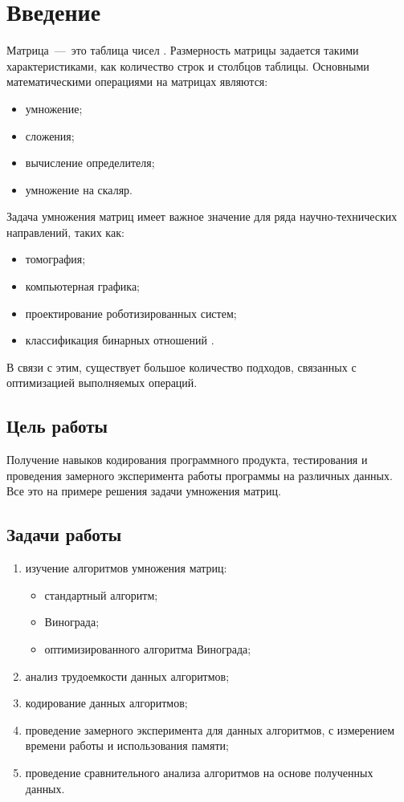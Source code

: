 \setcounter{page}{3}
\chapter*{Введение}

Матрица~---~это таблица чисел \cite{bib:1}. Размерность матрицы задается такими характеристиками, как количество строк и столбцов таблицы. Основными математическими операциями на матрицах являются:

\begin{itemize}
	\item умножение;
	\item сложения;
	\item вычисление определителя;
	\item умножение на скаляр.
\end{itemize}

Задача умножения матриц имеет важное значение для ряда научно-технических направлений, таких как:

\begin{itemize}
	\item томография;
	\item компьютерная графика;
	\item проектирование роботизированных систем;
	\item классификация бинарных отношений \cite{bib:7}.
\end{itemize}

В связи с этим, существует большое количество подходов, связанных с оптимизацией выполняемых операций.

\section*{Цель работы}

Получение навыков кодирования программного продукта, тестирования и проведения замерного эксперимента работы программы на различных данных. Все это на примере решения задачи умножения матриц.

\section*{Задачи работы}

\begin{enumerate}[label={\arabic*)}]
	\item изучение алгоритмов умножения матриц:
	\begin{itemize}
		\item стандартный алгоритм;
		\item Винограда;
		\item оптимизированного алгоритма Винограда;
	\end{itemize}
	\item анализ трудоемкости данных алгоритмов;
	\item кодирование данных алгоритмов;
	\item проведение замерного эксперимента для данных алгоритмов, с измерением времени работы и использования памяти; 
	\item проведение сравнительного анализа алгоритмов на основе полученных данных.
\end{enumerate}

\newpage